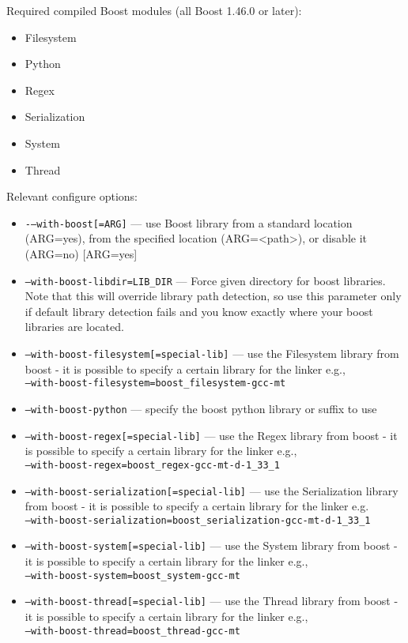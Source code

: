 \documentclass[12pt]{article}
\begin{document}
\noindent
Required compiled Boost modules (all Boost 1.46.0 or later): \\
\begin{itemize}
\item Filesystem
\item Python
\item Regex
\item Serialization
\item System
\item Thread
\end{itemize}
\noindent
Relevant configure options: 
\begin{itemize}
\item {\tt -}{\tt --with-boost[=ARG]} --- use Boost library from a standard
 location (ARG=yes), from the specified location (ARG=<path>), or disable
 it (ARG=no) [ARG=yes]
\item {\tt --with-boost-libdir=LIB\_DIR}  --- Force given directory for
 boost libraries. Note that this will override
 library path detection, so use this parameter only if default library
 detection fails and you know exactly where your boost libraries are
 located.
\item {\tt --with-boost-filesystem[=special-lib]} --- use the Filesystem
 library from boost - it is possible to specify a
 certain library for the linker e.g., \\
 {\tt --with-boost-filesystem=boost\_filesystem-gcc-mt}
\item {\tt --with-boost-python} --- specify the boost python library or
 suffix to use
\item {\tt --with-boost-regex[=special-lib]} --- use the Regex library from
 boost - it is possible to specify a certain library for the linker e.g., \\
 {\tt --with-boost-regex=boost\_regex-gcc-mt-d-1\_33\_1}
\item {\tt --with-boost-serialization[=special-lib]} --- use the
 Serialization library from boost - it is possible to specify a
 certain library for the linker e.g. \\
 {\tt --with-boost-serialization=boost\_serialization-gcc-mt-d-1\_33\_1}
\item {\tt --with-boost-system[=special-lib]} --- use the System library
 from boost - it is possible to specify a certain
 library for the linker e.g., \\ 
 {\tt --with-boost-system=boost\_system-gcc-mt}
\item {\tt --with-boost-thread[=special-lib]} --- 
 use the Thread library from boost - it is possible to specify a certain
 library for the linker e.g., \\
 {\tt --with-boost-thread=boost\_thread-gcc-mt}
\end{itemize}
\end{document}
